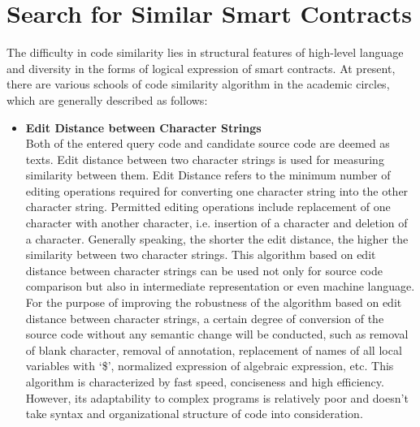 \section{Search for Similar Smart Contracts}
\label{appendix:sim_code}

The difficulty in code similarity lies in structural features of high-level language and diversity in the forms of logical expression of smart contracts. At present, there are various schools of code similarity algorithm in the academic circles, which are generally described as follows: 


\begin{itemize}
	\item \textbf{Edit Distance between Character Strings} \\
	Both of the entered query code and candidate source code are deemed as texts. Edit distance between two character strings is used for measuring similarity between them. Edit Distance refers to the minimum number of editing operations required for converting one character string into the other character string. Permitted editing operations include replacement of one character with another character, i.e. insertion of a character and deletion of a character. Generally speaking, the shorter the edit distance, the higher the similarity between two character strings. This algorithm based on edit distance between character strings can be used not only for source code comparison but also in intermediate representation or even machine language.
	For the purpose of improving the robustness of the algorithm based on edit distance between character strings, a certain degree of conversion of the source code without any semantic change will be conducted, such as removal of blank character, removal of annotation, replacement of names of all local variables with ‘\$’, normalized expression of algebraic expression, etc. This algorithm is characterized by fast speed, conciseness and high efficiency. However, its adaptability to complex programs is relatively poor and doesn't take syntax and organizational structure of code into consideration. 


\end{itemize}
